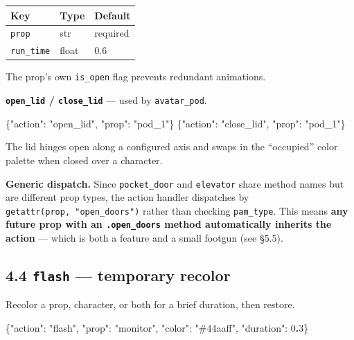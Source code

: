 \documentclass[
  12pt,
  letterpaper,
]{book}
\newenvironment{Shaded}{}{}
\newcommand{\DataTypeTok}[1]{\textcolor[rgb]{0.56,0.13,0.00}{#1}}
\newcommand{\DecValTok}[1]{\textcolor[rgb]{0.25,0.63,0.44}{#1}}
\newcommand{\ErrorTok}[1]{\textcolor[rgb]{1.00,0.00,0.00}{\textbf{#1}}}
\newcommand{\FunctionTok}[1]{\textcolor[rgb]{0.02,0.16,0.49}{#1}}
\newcommand{\StringTok}[1]{\textcolor[rgb]{0.25,0.44,0.63}{#1}}
\begin{document}
\begin{longtable}[]{@{}lll@{}}
\toprule\noalign{}
Key & Type & Default \\
\midrule\noalign{}
\endhead
\bottomrule\noalign{}
\endlastfoot
\texttt{prop} & str & required \\
\texttt{run\_time} & float & 0.6 \\
\end{longtable}

The prop's own \texttt{is\_open} flag prevents redundant animations.

\textbf{\texttt{open\_lid} / \texttt{close\_lid}} --- used by
\texttt{avatar\_pod}.

\begin{Shaded}
\begin{Highlighting}[]
\FunctionTok{\{}\DataTypeTok{"action"}\FunctionTok{:} \StringTok{"open\_lid"}\FunctionTok{,} \DataTypeTok{"prop"}\FunctionTok{:} \StringTok{"pod\_1"}\FunctionTok{\}}
\FunctionTok{\{}\DataTypeTok{"action"}\FunctionTok{:} \StringTok{"close\_lid"}\FunctionTok{,} \DataTypeTok{"prop"}\FunctionTok{:} \StringTok{"pod\_1"}\FunctionTok{\}}
\end{Highlighting}
\end{Shaded}

The lid hinges open along a configured axis and swaps in the
``occupied'' color palette when closed over a character.

\textbf{Generic dispatch.} Since \texttt{pocket\_door} and
\texttt{elevator} share method names but are different prop types, the
action handler dispatches by \texttt{getattr(prop,\ "open\_doors")}
rather than checking \texttt{pam\_type}. This means \textbf{any future
prop with an \texttt{.open\_doors} method automatically inherits the
action} --- which is both a feature and a small footgun (see §5.5).

\subsection{\texorpdfstring{4.4 \texttt{flash} --- temporary
recolor}{4.4 flash --- temporary recolor}}\label{flash-temporary-recolor}

Recolor a prop, character, or both for a brief duration, then restore.

\begin{Shaded}
\begin{Highlighting}[]
\FunctionTok{\{}\DataTypeTok{"action"}\FunctionTok{:} \StringTok{"flash"}\FunctionTok{,} \DataTypeTok{"prop"}\FunctionTok{:} \StringTok{"monitor"}\FunctionTok{,}
 \DataTypeTok{"color"}\FunctionTok{:} \StringTok{"\#44aaff"}\FunctionTok{,} \DataTypeTok{"duration"}\FunctionTok{:} \DecValTok{0}\ErrorTok{.}\DecValTok{3}\FunctionTok{\}}
\end{Highlighting}
\end{Shaded}
\end{document}
